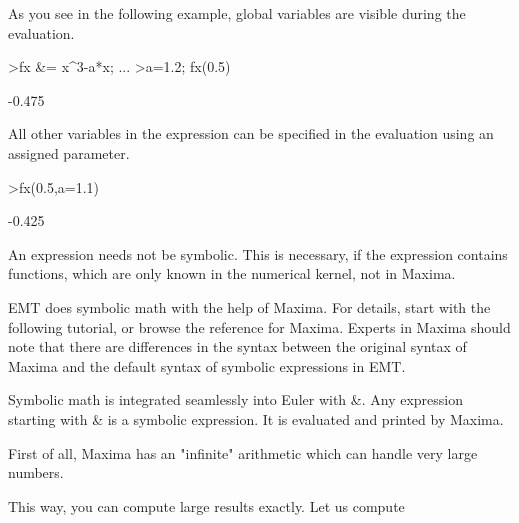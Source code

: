 \documentclass{article}
\begin{document}
\begin{eulernotebook}
\begin{eulercomment}
As you see in the following example, global variables are visible during the
evaluation.
\end{eulercomment}
\begin{eulerprompt}
>fx &= x^3-a*x;  ...
>a=1.2; fx(0.5)
\end{eulerprompt}
\begin{euleroutput}
  -0.475
\end{euleroutput}
\begin{eulercomment}
All other variables in the expression can be specified in the evaluation
using an assigned parameter.
\end{eulercomment}
\begin{eulerprompt}
>fx(0.5,a=1.1)
\end{eulerprompt}
\begin{euleroutput}
  -0.425
\end{euleroutput}
\begin{eulercomment}
An expression needs not be symbolic. This is necessary, if the expression
contains functions, which are only known in the numerical kernel, not in
Maxima.

\begin{eulercomment}
\begin{eulercomment}
EMT does symbolic math with the help of Maxima. For details, start with the
following tutorial, or browse the reference for Maxima. Experts in Maxima
should note that there are differences in the syntax between the original
syntax of Maxima and the default syntax of symbolic expressions in EMT.

Symbolic math is integrated seamlessly into Euler with \&. Any expression
starting with \& is a symbolic expression. It is evaluated and printed by
Maxima.

First of all, Maxima has an "infinite" arithmetic which can handle
very large numbers.
\end{eulercomment}
\begin{eulercomment}
This way, you can compute large results exactly. Let us compute


\end{eulercomment}
\end{eulercomment}
\end{eulercomment}
\end{eulernotebook}
\end{document}
